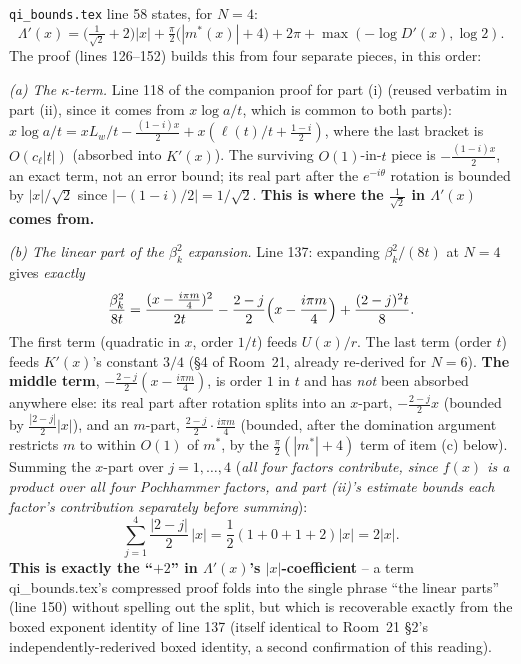 \documentclass[11pt]{article}
\begin{document}
\texttt{qi\_bounds.tex} line 58 states, for $N=4$:
\[
 \Lambda'(x)=\bigl(\tfrac1{\sqrt2}+2\bigr)|x|+\tfrac\pi2\bigl(|m^\ast(x)|+4\bigr)+2\pi
 +\max(-\log D'(x),\log2).
\]
The proof (lines 126--152) builds this from four separate pieces, in this order:

\emph{(a) The $\kappa$-term.} Line 118 of the companion proof for part (i) (reused verbatim in
part (ii), since it comes from $x\log a/t$, which is common to both parts):
$x\log a/t=xL_w/t-\frac{(1-i)x}2+x(\ell(t)/t+\frac{1-i}2)$, where the last bracket is $O(c_\ell|t|)$
(absorbed into $K'(x)$). The surviving $O(1)$-in-$t$ piece is $-\frac{(1-i)x}2$, an exact term, not
an error bound; its real part after the $e^{-i\theta}$ rotation is bounded by $|x|/\sqrt2$ since
$|-(1-i)/2|=1/\sqrt2$. \textbf{This is where the $\frac1{\sqrt2}$ in $\Lambda'(x)$ comes from.}

\emph{(b) The linear part of the $\beta_k^2$ expansion.} Line 137: expanding $\beta_k^2/(8t)$ at
$N=4$ gives \emph{exactly}
\[
 \frac{\beta_k^2}{8t}=\frac{(x-\frac{i\pi m}4)^2}{2t}-\frac{2-j}2\Bigl(x-\frac{i\pi m}4\Bigr)
 +\frac{(2-j)^2t}8 .
\]
The first term (quadratic in $x$, order $1/t$) feeds $U(x)/r$. The last term (order $t$) feeds
$K'(x)$'s constant $3/4$ (\S4 of Room~21, already re-derived for $N=6$). \textbf{The middle term},
$-\frac{2-j}2(x-\frac{i\pi m}4)$, is order $1$ in $t$ and has \emph{not} been absorbed anywhere
else: its real part after rotation splits into an $x$-part, $-\frac{2-j}2x$ (bounded by
$\frac{|2-j|}2|x|$), and an $m$-part, $\frac{2-j}2\cdot\frac{i\pi m}4$ (bounded, after the
domination argument restricts $m$ to within $O(1)$ of $m^\ast$, by the $\frac\pi2(|m^\ast|+4)$
term of item (c) below). Summing the $x$-part over $j=1,\dots,4$ (\emph{all four factors
contribute, since $f(x)$ is a product over all four Pochhammer factors, and part (ii)'s estimate
bounds each factor's contribution separately before summing}):
\[
 \sum_{j=1}^4\frac{|2-j|}2\,|x|=\frac12(1+0+1+2)|x|=2|x|.
\]
\textbf{This is exactly the ``$+2$'' in $\Lambda'(x)$'s $|x|$-coefficient} -- a term qi\_bounds.tex's
compressed proof folds into the single phrase ``the linear parts'' (line 150) without spelling out
the split, but which is recoverable exactly from the boxed exponent identity of line 137 (itself
identical to Room~21 \S2's independently-rederived boxed identity, a second confirmation of this
reading).
\end{document}
